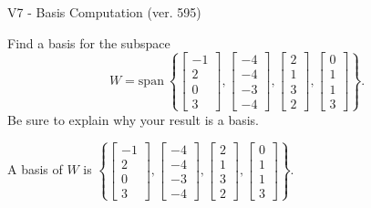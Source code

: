 \begin{exercise}
  \begin{exerciseTitle}V7 - Basis Computation (ver. 595)\end{exerciseTitle}
  \begin{exerciseStatement}
    Find a basis for the subspace 
\[W=\mathrm{span}\ \left\{\left[\begin{array}{r}
-1 \\
2 \\
0 \\
3
\end{array}\right] , \left[\begin{array}{r}
-4 \\
-4 \\
-3 \\
-4
\end{array}\right] , \left[\begin{array}{r}
2 \\
1 \\
3 \\
2
\end{array}\right] , \left[\begin{array}{r}
0 \\
1 \\
1 \\
3
\end{array}\right]\right\}.\]
 Be sure to explain why your result is a basis.


  \end{exerciseStatement}
  \begin{exerciseAnswer}
   A basis of \(W\) is  \(\left\{\left[\begin{array}{r}
-1 \\
2 \\
0 \\
3
\end{array}\right] , \left[\begin{array}{r}
-4 \\
-4 \\
-3 \\
-4
\end{array}\right] , \left[\begin{array}{r}
2 \\
1 \\
3 \\
2
\end{array}\right] , \left[\begin{array}{r}
0 \\
1 \\
1 \\
3
\end{array}\right]\right\}\).
  


  \end{exerciseAnswer}
\end{exercise}